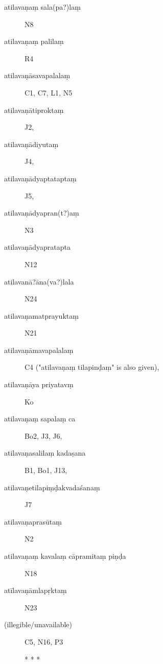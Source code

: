 \begin{ekdosis}
\begin{marma}[hp01_055]
\begin{marma}[hp01_060]
\begin{description}
\item[atilavaṇaṃ sala(pa?)laṃ]   N8
\item[atilavaṇaṃ palilaṃ]         R4
\item[atilavaṇāsavapalalaṃ]        C1, C7, L1, N5
\item[atilavaṇātiproktaṃ]        J2,
\item[atilavaṇādiyutaṃ]        J4,
\item[atilavaṇādyaptataptaṃ]        J5,
\item[atilavaṇādyapran(t?)aṃ]  N3
\item[atilavaṇādyapratapta]   N12
\item[atilavanā?āna(va?)lala]   N24
\item[atilavaṇamatprayuktaṃ]   N21
\item[atilavaṇāmavapalalaṃ]        C4 ("atilavaṇaṃ tilapinḍaṃ" is also given),
\item[atilavaṇāya priyatavṃ]        Ko
\item[atilavaṇaṃ sapalaṃ ca]        Bo2, J3, J6,
\item[atilavaṇasalilaṃ kadaṣana]        B1, Bo1, J13,
\item[atilavaṇetilapiṃḍakvadaśanaṃ]        J7
\item[atilavaṇaprasūtaṃ]         N2
\item[atilavaṇaṃ kavalaṃ cāpramitaṃ piṇḍa]   N18
\item[atīlavaṇāmlapṛktaṃ]   N23
\item[(illegible/unavailable)]  C5, N16, P3

* * *


\end{description}
\end{marma}
\end{marma}
\end{ekdosis}
